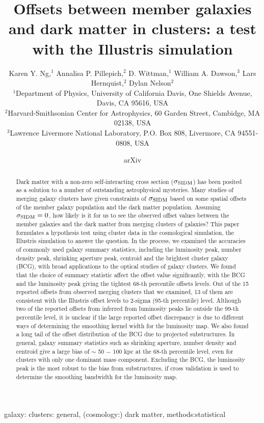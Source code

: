 \documentclass[usenatbib]{mn2e}
\title[
	Offsets between member galaxies and dark matter in clusters: a
test with the Illustris simulation]
{Offsets between member galaxies and dark matter in clusters: a
	test with the Illustris simulation}
\author[Karen Y. Ng et al.]{Karen Y. Ng,$^1$
	Annalisa P. Pillepich,$^2$ 
	D. Wittman,$^1$
	William A. Dawson,$^3$ 
	\newauthor Lars Hernquist,$^{2}$
	Dylan Nelson$^{2}$ \\ 
$^{1}$Department of Physics, University of California Davis, One Shields
Avenue, Davis, CA 95616, USA\\ 
$^{2}$Harvard-Smithsonian Center for Astrophysics, 60 Garden Street, Cambidge,
MA 02138, USA\\
$^{3}$Lawrence Livermore National Laboratory, P.O. Box 808, Livermore, CA 94551-0808, USA \\}
\begin{document}
\date{arXiv} \pagerange{\pageref{firstpage}--\pageref{lastpage}}
 \maketitle\label{firstpage}
\begin{abstract} 
	Dark matter with a non-zero self-interacting cross section ($\sigma_{\rm
	SIDM}$) has been posited
	as a solution to a number of outstanding astrophysical mysteries.
	Many studies of merging galaxy clusters have given constraints of
	$\sigma_{\rm SIDM}$ based on some spatial offsets of the member galaxy
	population and the dark matter population.      
	Assuming $\sigma_{\rm SIDM} = 0$, how likely is
	it for us to see the observed offset values between the member galaxies and
	the dark matter from merging clusters of galaxies? 
	This paper formulates a hypothesis test using cluster data in the cosmological 
	simulation, the Illustris simulation to answer the question. 
	In the process,
	we examined the accuracies of commonly used galaxy summary 
	statistics, including the
	luminosity peak, number density peak, shrinking aperture peak, centroid and
	the brightest cluster galaxy (BCG), with broad applications to the optical studies of
	galaxy clusters. 	
	We found that the choice of summary statistic affect the offset
	value significantly, with the BCG and the luminosity peak giving the tightest
	68-th percentile offsets levels.  
	Out of the 15 reported offsets from observed merging clusters
	that we examined, 13 of
	them are consistent with the Illustris offset levels to 2-sigma 
	(95-th percentile) level. Although two of the reported offsets from inferred
	from luminosity peaks lie outside the 99-th percentile level, it is unclear
	if the large reported offset discrepancy is due to different ways of
	determining the smoothing kernel width for the luminosity map. 
	We also found a long
	tail of the offset distribution of the BCG due to projected 
	substructures. In general, galaxy summary statistics such as
	shrinking aperture, number density and centroid give a large bias of $\sim$ 50
	$-$ 100 kpc at
	the 68-th percentile level, even for clusters with only one dominant 
	mass component. Excluding the BCG, 
	the luminosity peak is the most 
	robust to the bias from substructures, 
	if cross validation is used to determine
	the smoothing bandwidth for the luminosity map.
\end{abstract}

\begin{keywords}
	galaxy: clusters: general, (cosmology:) dark matter, methods:statistical 
\end{keywords}





\appendix


\clearpage\bsp\label{lastpage} 
\end{document}
